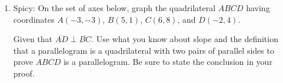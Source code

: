 \documentclass[12pt, twoside]{article}
\begin{document}
\begin{enumerate}

\newpage


\item Spicy: On the set of axes below, graph the quadrilateral $ABCD$ having coordinates $A(-3,-3)$, $B(5,1)$, $C(6,8)$, and $D(-2,4)$.
    \begin{center} %
    \end{center}
    Given that $\overline{AD} \perp \overline{BC}$. Use what you know about slope and the definition that a parallelogram is a quadrilateral with two pairs of parallel sides to prove $ABCD$ is a parallelogram. Be sure to state the conclusion in your proof.



\end{enumerate}
\end{document}
